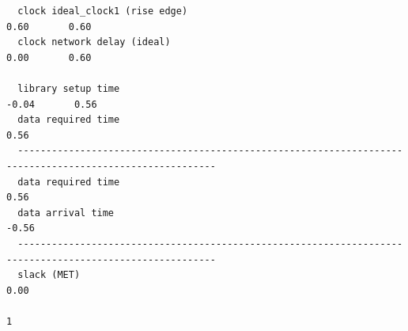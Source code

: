 \documentclass[a4paper,12pt,twoside]{article}
\begin{document}
\begin{verbatim}
  clock ideal_clock1 (rise edge)                                    0.60       0.60
  clock network delay (ideal)                                       0.00       0.60

  library setup time                                               -0.04       0.56
  data required time                                                           0.56
  ---------------------------------------------------------------------------------------------------------
  data required time                                                           0.56
  data arrival time                                                           -0.56
  ---------------------------------------------------------------------------------------------------------
  slack (MET)                                                                  0.00

1
\end{verbatim}
\end{document}
